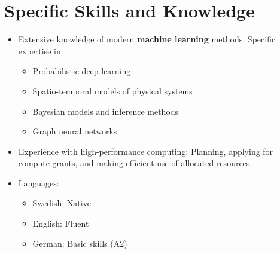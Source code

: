 \section*{Specific Skills and Knowledge}
\begin{itemize}
    \item Extensive knowledge of modern \textbf{machine learning} methods. Specific expertise in:
    \begin{itemize}
        \item Probabilistic deep learning
        \item Spatio-temporal models of physical systems
        \item Bayesian models and inference methods
        \item Graph neural networks
    \end{itemize}



    \item Experience with high-performance computing: Planning, applying for compute grants, and making efficient use of allocated resources.
    \item Languages:
    \begin{itemize}
        \item Swedish: Native
        \item English: Fluent
        \item German: Basic skills (A2)
    \end{itemize}
\end{itemize}


